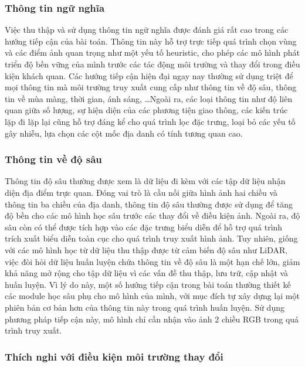 \subsubsection{Thông tin ngữ nghĩa}

Việc thu thập và sử dụng thông tin ngữ nghĩa được đánh giá rất cao trong các hướng tiếp cận của bài toán. Thông tin này hỗ trợ trực tiếp quá trình chọn vùng và các điểm ảnh quan trọng như một yếu tố heuristic, cho phép các mô hình phát triển độ bền vững của mình trước các tác động môi trường và thay đổi trong điều kiện khách quan. Các hướng tiếp cận hiện đại ngay nay thường sử dụng triệt để mọi thông tin mà môi trường truy xuất cung cấp như thông tin về độ sâu, thông tin về mùa màng, thời gian, ánh sáng, \dots Ngoài ra, các loại thông tin như độ liên quan giữa số lượng, sự hiện diện của các phương tiện giao thông, các kiến trúc lặp đi lặp lại cũng hỗ trợ đáng kể cho quá trình lọc đặc trưng, loại bỏ các yếu tố gây nhiễu, lựa chọn các cột mốc địa danh có tính tương quan cao.

\subsubsection{Thông tin về độ sâu}

Thông tin độ sâu thường được xem là dữ liệu đi kèm với các tập dữ liệu nhận diện địa điểm trực quan. Đóng vai trò là cầu nối giữa hình ảnh hai chiều và thông tin ba chiều của địa danh, thông tin độ sâu thường được sử dụng để tăng độ bền cho các mô hình học sâu trước các thay đổi về điều kiện ảnh. Ngoài ra, độ sâu còn có thể được tích hợp vào các đặc trưng biểu diễn để hỗ trợ quá trình trích xuất biểu diễn toàn cục cho quá trình truy xuất hình ảnh. Tuy nhiên, giống với các mô hình học từ dữ liệu thu thập được từ cảm biến độ sâu như LiDAR, việc đòi hỏi dữ liệu huấn luyện chứa thông tin về độ sâu là một hạn chế lớn, giảm khả năng mở rộng cho tập dữ liệu vì các vấn đề thu thập, lưu trữ, cập nhật và huấn luyện. Vì lý do này, một số hướng tiếp cận trong bài toán thường thiết kế các module học sâu phụ cho mô hình của mình, với mục đích tự xây dựng lại một phiên bản cơ bản hơn của thông tin này trong quá trình huấn luyện. Sử dụng phương pháp tiếp cận này, mô hình chỉ cần nhận vào ảnh 2 chiều RGB trong quá trình truy xuất\cite{piasco2019learning}.

\subsubsection{Thích nghi với điều kiện môi trường thay đổi}

